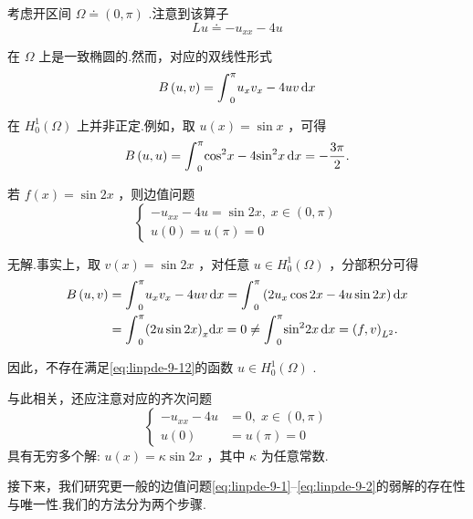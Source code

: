 \begin{instance}\label{ins:linpde-9-11}
考虑开区间 $\Omega  \doteq  ( 0,\pi )$ .注意到该算子
\[
{Lu} \doteq   - {u}_{xx} - {4u}
\]

在 $\Omega$ 上是一致椭圆的.然而，对应的双线性形式
\[
B\left(  {u,v}\right)   = {\int }_{0}^{\pi }{u}_{x}{v}_{x} - {4uv\mathop{}\!\mathrm{d} x}
\]

在 ${H}_{0}^{1}\left( \Omega \right)$ 上并非正定.例如，取 $u\left( x\right)  = \sin x$ ，可得
\[
B\left(  {u,u}\right)   = {\int }_{0}^{\pi }{\cos }^{2}x - 4{\sin }^{2}{x\mathop{}\!\mathrm{d} x} =  - \frac{3\pi }{2}.
\]

若 $f\left( x\right)  = \sin {2x}$ ，则边值问题
\begin{equation}\tag{9.29}\label{eq:linpde-9-29}
\begin{cases}  - {u}_{xx} - {4u} = \sin {2x},\; x \in  ( 0,\pi ) \\  u\left( 0\right) = u\left( \pi \right)  = 0 \end{cases}
\end{equation}

无解.事实上，取 $v\left( x\right)  = \sin {2x}$ ，对任意 $u \in  {H}_{0}^{1}\left( \Omega \right)$ ，分部积分可得
{\setjot[-2]\begin{align*}
    B\left({u,v}\right)  &= {\int }_{0}^{\pi }{u}_{x}{v}_{x} - {4uv\mathop{}\!\mathrm{d} x} = {\int }_{0}^{\pi }\left( {2{u}_{x}\cos {2x} - {4u}\sin {2x}}\right) {\mathop{}\!\mathrm{d} x}\\
    &= {\int }_{0}^{\pi }{\left( 2u\sin 2x\right) }_{x}{\mathop{}\!\mathrm{d} x} = 0 \neq  {\int }_{0}^{\pi }{\sin }^{2}{2x\mathop{}\!\mathrm{d} x} = {\left( f,v\right) }_{{L}^{2}}.
\end{align*}}


因此，不存在满足\eqref{eq:linpde-9-12}的函数 $u \in  {H}_{0}^{1}\left( \Omega \right)$ .

与此相关，还应注意对应的齐次问题
\begin{equation}\tag{9.30}\label{eq:linpde-9-30}
\begin{cases}  - {u}_{xx} - {4u} &  = 0,\;x \in  ( 0,\pi ) \\  u\left( 0\right) &  = u\left( \pi \right)  = 0 \end{cases}
\end{equation}
具有无穷多个解: $u\left( x\right)  = \kappa \sin {2x}$ ，其中 $\kappa$ 为任意常数.
\end{instance}

接下来，我们研究更一般的边值问题\eqref{eq:linpde-9-1}--\eqref{eq:linpde-9-2}的弱解的存在性与唯一性.我们的方法分为两个步骤.

